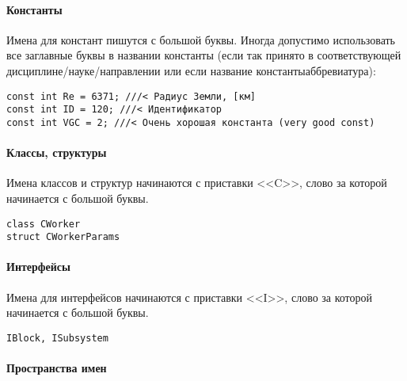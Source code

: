 \paragraph{Константы}

Имена для констант пишутся с большой буквы. Иногда допустимо использовать все заглавные буквы в названии константы (если так принято в соответствующей дисциплине/науке/направлении или если название константы\mdash аббревиатура): 

\begin{lstlisting}[frame=single,numbers=none]
const int Re = 6371; ///< Радиус Земли, [км]
const int ID = 120; ///< Идентификатор
const int VGC = 2; ///< Очень хорошая константа (very good const)
\end{lstlisting}


\paragraph{Классы, структуры}

Имена классов и структур начинаются с приставки <<C>>, слово за которой начинается с большой буквы. 

\begin{lstlisting}[frame=single,numbers=none]
class CWorker
struct CWorkerParams
\end{lstlisting}

\paragraph{Интерфейсы}

Имена для интерфейсов начинаются с приставки <<I>>, слово за которой начинается с большой буквы.

\begin{lstlisting}[frame=single,numbers=none]
IBlock, ISubsystem
\end{lstlisting}

\paragraph{Пространства имен}


